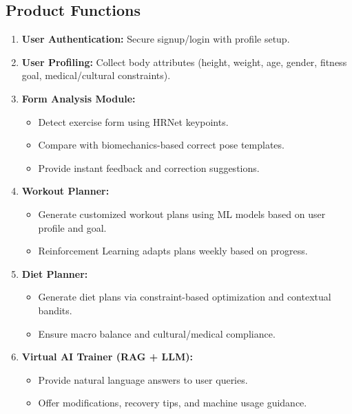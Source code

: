 \documentclass[12pt,a4paper]{article}
\begin{document}
\subsection{Product Functions}
\begin{enumerate}[leftmargin=*]
    \item \textbf{User Authentication:} Secure signup/login with profile setup.
    
    \item \textbf{User Profiling:} Collect body attributes (height, weight, age, gender, fitness goal, medical/cultural constraints).
    
    \item \textbf{Form Analysis Module:}
    \begin{itemize}
        \item Detect exercise form using HRNet keypoints.
        \item Compare with biomechanics-based correct pose templates.
        \item Provide instant feedback and correction suggestions.
    \end{itemize}
    
    \item \textbf{Workout Planner:}
    \begin{itemize}
        \item Generate customized workout plans using ML models based on user profile and goal.
        \item Reinforcement Learning adapts plans weekly based on progress.
    \end{itemize}
    
    \item \textbf{Diet Planner:}
    \begin{itemize}
        \item Generate diet plans via constraint-based optimization and contextual bandits.
        \item Ensure macro balance and cultural/medical compliance.
    \end{itemize}
    
    \item \textbf{Virtual AI Trainer (RAG + LLM):}
    \begin{itemize}
        \item Provide natural language answers to user queries.
        \item Offer modifications, recovery tips, and machine usage guidance.
    \end{itemize}
    

\end{enumerate}
\end{document}
